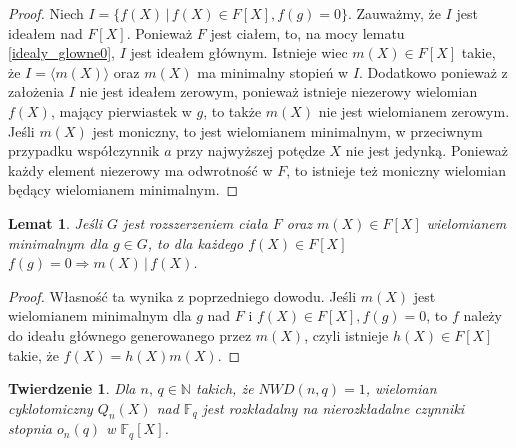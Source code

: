 \documentclass[declaration,shortabstract]{iithesis}
\theoremstyle{definition}
\theoremstyle{remark} \newtheorem{observation}{Obserwacja}
\theoremstyle{plain} \newtheorem{theorem}{Twierdzenie}
\theoremstyle{plain} \newtheorem{lemma}{Lemat}
\theoremstyle{remark} \newtheorem*{remark*}{Uwaga}
\theoremstyle{reminder} \newtheorem*{reminder*}{Przypomnienie}
\begin{document}
	
\begin{proof}
	Niech $I = \{f(X) \, | \, f(X) \in F[X], f(g) = 0\}$. Zauważmy, że $I$ jest ideałem nad $F[X]$. Ponieważ $F$ jest ciałem, to, na mocy lematu \ref{idealy_glowne0}, $I$ jest ideałem głównym. Istnieje wiec $m(X) \in F[X]$ takie, że $I = \langle m(X) \rangle$ oraz $m(X)$ ma minimalny stopień w $I$. Dodatkowo ponieważ z założenia $I$ nie jest ideałem zerowym, ponieważ istnieje niezerowy wielomian $f(X)$, mający pierwiastek w $g$, to także $m(X)$ nie jest wielomianem zerowym. Jeśli $m(X)$ jest moniczny, to jest wielomianem minimalnym, w przeciwnym przypadku współczynnik $a$ przy najwyższej potędze $X$ nie jest jedynką. Ponieważ każdy element niezerowy ma odwrotność w $F$, to istnieje też moniczny wielomian będący wielomianem minimalnym.
\end{proof}
	
\begin{lemma}
	Jeśli $G$ jest rozszerzeniem ciała $F$ oraz $m(X) \in F[X]$ wielomianem minimalnym dla $g \in G$, to dla każdego $f(X) \in F[X]$ $f(g) = 0 \Rightarrow m(X) \, | \, f(X)$.
\end{lemma}
	
\begin{proof}
	Własność ta wynika z poprzedniego dowodu. Jeśli $m(X)$ jest wielomianem minimalnym dla $g$ nad $F$ i $f(X) \in F[X], f(g) = 0$, to $f$ należy do ideału głównego generowanego przez $m(X)$, czyli istnieje $h(X) \in F[X]$ takie, że $f(X) = h(X)m(X)$.
\end{proof}
	
\begin{theorem} \label{kluczowe}
	Dla $n, \, q \in \mathbb{N}$ takich, że $NWD(n, q) = 1$, wielomian cyklotomiczny $Q_n(X)$ nad $\mathbb{F}_q$ jest rozkładalny na nierozkładalne czynniki stopnia $o_n(q)$ w $\mathbb{F}_q[X]$.
\end{theorem}
	
\end{document}
